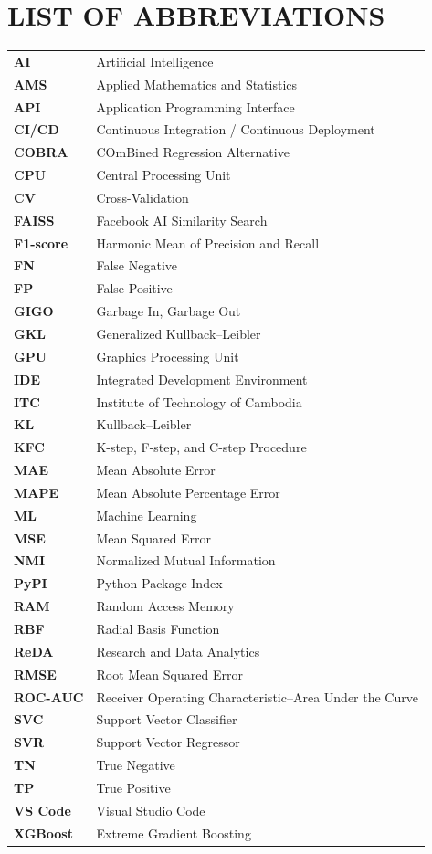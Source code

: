 \clearpage
{}
\chapter*{\centering LIST OF ABBREVIATIONS}

\begin{longtable}{@{} >{\bfseries}p{3cm} p{10.5cm} @{}}
AI      & Artificial Intelligence \\
AMS     & Applied Mathematics and Statistics \\
API     & Application Programming Interface \\
CI/CD   & Continuous Integration / Continuous Deployment \\
COBRA   & COmBined Regression Alternative \\
CPU     & Central Processing Unit \\
CV      & Cross-Validation \\
FAISS   & Facebook AI Similarity Search \\
F1-score & Harmonic Mean of Precision and Recall \\
FN      & False Negative \\
FP      & False Positive \\
GIGO    & Garbage In, Garbage Out \\
GKL     & Generalized Kullback--Leibler \\
GPU     & Graphics Processing Unit \\
IDE     & Integrated Development Environment \\
ITC     & Institute of Technology of Cambodia \\
KL      & Kullback--Leibler \\
KFC     & K-step, F-step, and C-step Procedure \\
MAE     & Mean Absolute Error \\
MAPE    & Mean Absolute Percentage Error \\
ML      & Machine Learning \\
MSE     & Mean Squared Error \\
NMI     & Normalized Mutual Information \\
PyPI    & Python Package Index \\
RAM     & Random Access Memory \\
RBF     & Radial Basis Function \\
ReDA    & Research and Data Analytics \\
RMSE    & Root Mean Squared Error \\
ROC-AUC & Receiver Operating Characteristic--Area Under the Curve \\
SVC     & Support Vector Classifier \\
SVR     & Support Vector Regressor \\
TN      & True Negative \\
TP      & True Positive \\
VS Code & Visual Studio Code \\
XGBoost & Extreme Gradient Boosting \\
\end{longtable}
\clearpage
